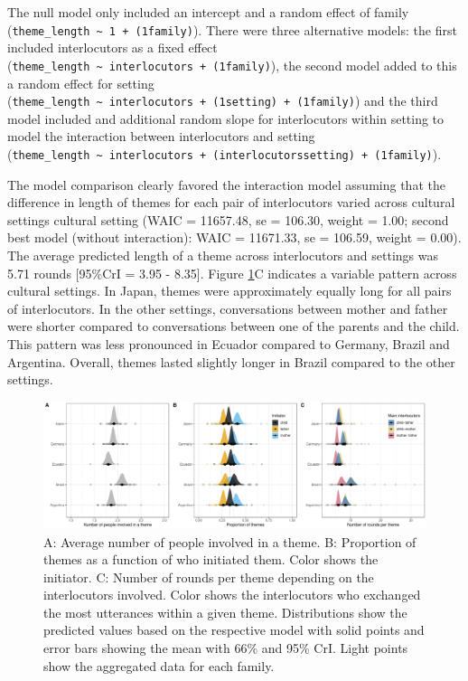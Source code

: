 \documentclass[
  man,floatsintext]{apa6}
\begin{document}
The null model only included an intercept and a random effect of family (\texttt{theme\_length\ \textasciitilde{}\ 1\ +\ (1\textbar{}family)}). There were three alternative models: the first included interlocutors as a fixed effect (\texttt{theme\_length\ \textasciitilde{}\ interlocutors\ +\ (1\textbar{}family)}), the second model added to this a random effect for setting (\texttt{theme\_length\ \textasciitilde{}\ interlocutors\ +\ (1\textbar{}setting)\ +\ (1\textbar{}family)}) and the third model included and additional random slope for interlocutors within setting to model the interaction between interlocutors and setting (\texttt{theme\_length\ \textasciitilde{}\ interlocutors\ +\ (interlocutors\textbar{}setting)\ +\ (1\textbar{}family)}).

The model comparison clearly favored the interaction model assuming that the difference in length of themes for each pair of interlocutors varied across cultural settings cultural setting (WAIC = 11657.48, se = 106.30, weight = 1.00; second best model (without interaction): WAIC = 11671.33, se = 106.59, weight = 0.00). The average predicted length of a theme across interlocutors and settings was 5.71 rounds {[}95\%CrI = 3.95 - 8.35{]}. Figure \ref{fig:fig3}C indicates a variable pattern across cultural settings. In Japan, themes were approximately equally long for all pairs of interlocutors. In the other settings, conversations between mother and father were shorter compared to conversations between one of the parents and the child. This pattern was less pronounced in Ecuador compared to Germany, Brazil and Argentina. Overall, themes lasted slightly longer in Brazil compared to the other settings.

\begin{figure}
\includegraphics[width=1\linewidth]{../visuals/fig3} \caption{A: Average number of people involved in a theme. B: Proportion of themes as a function of who initiated them. Color shows the initiator. C: Number of rounds per theme depending on the interlocutors involved. Color shows the interlocutors who exchanged the most utterances within a given theme. Distributions show the predicted values based on the respective model with solid points and error bars showing the mean with 66\% and 95\% CrI. Light points show the aggregated data for each family.}\label{fig:fig3}
\end{figure}
\end{document}
